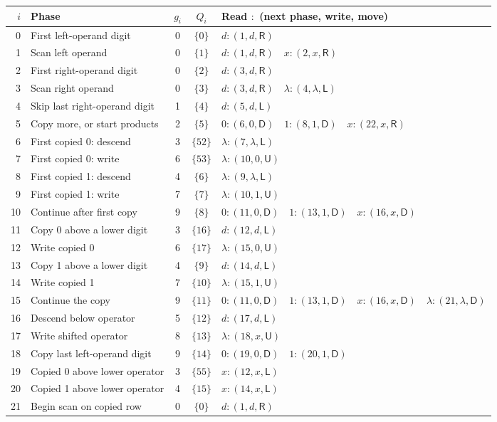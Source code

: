 \documentclass[11pt,a4paper]{article}
\newcommand{\blank}{\lambda}
\newcommand{\triple}[3]{(#1,#2,\mathsf{#3})}
\begin{document}
\begin{center}
\fontsize{9.2}{11}\selectfont\renewcommand{\arraystretch}{1.23}
\setlength{\tabcolsep}{4pt}
\begin{tabularx}{\textwidth}{r p{6cm} c c X}
\toprule\rowcolor{Pale}$i$ & Phase & $g_i$ & $Q_i$ & Read $:$ (next phase, write, move)\\\midrule
0 & First left-operand digit & 0 & $\{0\}$ & $d:\triple{1}{d}{R}$ \\
1 & Scan left operand & 0 & $\{1\}$ & $d:\triple{1}{d}{R}\quad x:\triple{2}{x}{R}$ \\
2 & First right-operand digit & 0 & $\{2\}$ & $d:\triple{3}{d}{R}$ \\
3 & Scan right operand & 0 & $\{3\}$ & $d:\triple{3}{d}{R}\quad \blank:\triple{4}{\blank}{L}$ \\
4 & Skip last right-operand digit & 1 & $\{4\}$ & $d:\triple{5}{d}{L}$ \\
5 & Copy more, or start products & 2 & $\{5\}$ & $0:\triple{6}{0}{D}\quad 1:\triple{8}{1}{D}\quad x:\triple{22}{x}{R}$ \\
6 & First copied 0: descend & 3 & $\{52\}$ & $\blank:\triple{7}{\blank}{L}$ \\
7 & First copied 0: write & 6 & $\{53\}$ & $\blank:\triple{10}{0}{U}$ \\
8 & First copied 1: descend & 4 & $\{6\}$ & $\blank:\triple{9}{\blank}{L}$ \\
9 & First copied 1: write & 7 & $\{7\}$ & $\blank:\triple{10}{1}{U}$ \\
10 & Continue after first copy & 9 & $\{8\}$ & $0:\triple{11}{0}{D}\quad 1:\triple{13}{1}{D}\quad x:\triple{16}{x}{D}$ \\
11 & Copy 0 above a lower digit & 3 & $\{16\}$ & $d:\triple{12}{d}{L}$ \\
12 & Write copied 0 & 6 & $\{17\}$ & $\blank:\triple{15}{0}{U}$ \\
13 & Copy 1 above a lower digit & 4 & $\{9\}$ & $d:\triple{14}{d}{L}$ \\
14 & Write copied 1 & 7 & $\{10\}$ & $\blank:\triple{15}{1}{U}$ \\
15 & Continue the copy & 9 & $\{11\}$ & $0:\triple{11}{0}{D}\quad 1:\triple{13}{1}{D}\quad x:\triple{16}{x}{D}\quad \blank:\triple{21}{\blank}{D}$ \\
16 & Descend below operator & 5 & $\{12\}$ & $d:\triple{17}{d}{L}$ \\
17 & Write shifted operator & 8 & $\{13\}$ & $\blank:\triple{18}{x}{U}$ \\
18 & Copy last left-operand digit & 9 & $\{14\}$ & $0:\triple{19}{0}{D}\quad 1:\triple{20}{1}{D}$ \\
19 & Copied 0 above lower operator & 3 & $\{55\}$ & $x:\triple{12}{x}{L}$ \\
20 & Copied 1 above lower operator & 4 & $\{15\}$ & $x:\triple{14}{x}{L}$ \\
21 & Begin scan on copied row & 0 & $\{0\}$ & $d:\triple{1}{d}{R}$ \\
\bottomrule
\end{tabularx}
\end{center}
\end{document}
